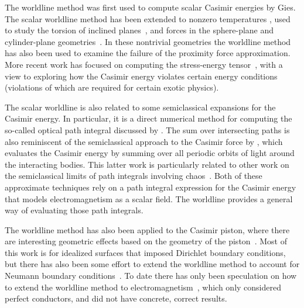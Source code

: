 The worldline method was first used to compute scalar Casimir energies by Gies\etal\citep{Gies2003,Gies2006, Gies2006a}.
The scalar worldline method has been extended to nonzero temperatures \citep{Klingmueller2008},
 used to study the torsion of inclined planes~\citep{Weber2009},
and forces in the sphere-plane and cylinder-plane geometries~\citep{Weber2010, Weber2010a}.  
In these nontrivial geometries the worldline method has also been used to examine the failure of the proximity force approximation.
More recent work has focused on computing the stress-energy tensor~\citep{Schafer2012, Schafer2016},
with a view to exploring how the Casimir energy violates certain energy conditions (violations of which are required for certain exotic physics).

The scalar worldline is also related to some semiclassical expansions for the Casimir energy.  
In particular, it is a direct numerical method for computing the so-called optical path integral
discussed by \citet{Scardicchio2005, Scardicchio2006}.  The sum over intersecting paths is also reminiscent 
of the semiclassical approach to the Casimir force by \citet{Schaden1998}, which evaluates 
the Casimir energy by summing over all periodic orbits of light around the interacting bodies.  This latter work is particularly 
related to other work on the semiclassical limits of path integrals involving chaos~\citep{Gutzwiller1990}.
Both of these approximate techniques rely on a path integral expression for the Casimir energy that models electromagnetism as a
scalar field. The worldline provides a general way of evaluating those path integrals.   

The worldline method has also been applied to the Casimir piston, where there are interesting geometric effects
based on the geometry of the piston~\citep{Schaden2009,Schaden2009a}.
Most of this work is for idealized surfaces that imposed Dirichlet boundary conditions, but 
there has also been some effort to extend the worldline method to account for Neumann boundary
conditions~\citep{Fosco2010}.  To date there has only been speculation on how to extend the 
worldline method to electromagnetism~\citep{Aehlig2011}, which only considered perfect conductors,
and did not have concrete, correct results.    


